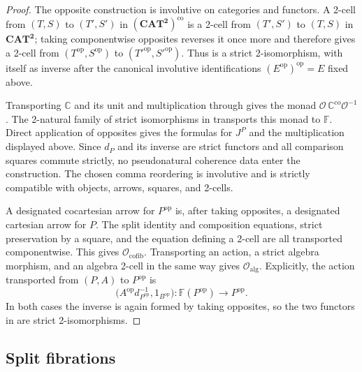 \documentclass[11pt]{article}
\theoremstyle{plain}
\theoremstyle{definition}
\theoremstyle{remark}
\newcommand{\CAT}{\mathbf{CAT}}
\newcommand{\C}{\mathbb{C}}
\numberwithin{equation}{section}
\begin{document}
\begin{proof}
The opposite construction is involutive on categories and functors.
A 2-cell from $(T,S)$ to $(T',S')$ in
$(\CAT^{\mathbf 2})^{\mathrm{co}}$ is a 2-cell from $(T',S')$ to
$(T,S)$ in $\CAT^{\mathbf 2}$; taking componentwise opposites reverses
it once more and therefore gives a 2-cell from
$(T^{\mathrm{op}},S^{\mathrm{op}})$ to
$(T'^{\mathrm{op}},S'^{\mathrm{op}})$.  Thus 
is a strict 2-isomorphism, with itself as inverse after the canonical
involutive identifications $(E^{\mathrm{op}})^{\mathrm{op}}=E$ fixed
above.

Transporting $\C$ and its unit and multiplication through
 gives the monad
$\mathcal O\,\C^{\mathrm{co}}\mathcal O^{-1}$.  The 2-natural family
of strict isomorphisms in 
transports this monad to $\mathbb F$.  Direct application of opposites
gives the formulas for
$J^{P}$ and the multiplication displayed above.  Since $d_P$ and its
inverse are strict functors and all comparison squares commute
strictly, no pseudonatural coherence data enter the construction.
The chosen comma reordering is involutive and is strictly compatible
with objects, arrows, squares, and 2-cells.

A designated cocartesian arrow for $P^{\mathrm{op}}$ is, after taking
opposites, a designated cartesian arrow for $P$.  The split identity
and composition equations, strict preservation by a square, and the
equation defining a 2-cell are all transported componentwise.  This
gives $\mathcal O_{\mathrm{cofib}}$.  Transporting an action, a strict
algebra morphism, and an algebra 2-cell in the same way gives
$\mathcal O_{\mathrm{alg}}$.  Explicitly, the action transported from
$(P,A)$ to $P^{\mathrm{op}}$ is
\begin{equation*}
  \bigl(A^{\mathrm{op}}d_{P^{\mathrm{op}}}^{-1},
  1_{B^{\mathrm{op}}}\bigr)\colon
  \mathbb F(P^{\mathrm{op}})\longrightarrow P^{\mathrm{op}}.
\end{equation*}
In both cases the inverse is again formed
by taking opposites, so the two functors in
 are strict 2-isomorphisms.
\end{proof}

\subsection{Split fibrations}
\end{document}
